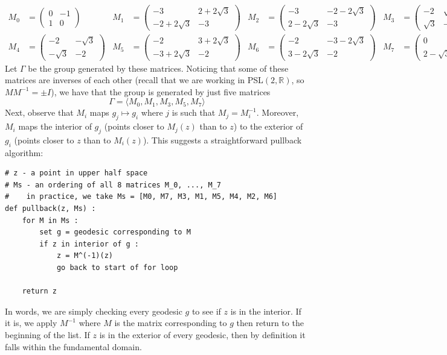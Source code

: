 \documentclass[]{article}
\begin{document}
\begin{align*}
	M_0 &= \begin{pmatrix}
		0 & -1 \\
		1 & 0
	\end{pmatrix} &
	M_1 &= \begin{pmatrix}
		-3 & 2 + 2\sqrt{3} \\
		-2 + 2\sqrt{3} & -3
	\end{pmatrix} &
	M_2 &= \begin{pmatrix}
		-3 & -2 - 2\sqrt{3} \\
		2 - 2\sqrt{3} & -3
	\end{pmatrix} &
	M_3 &= \begin{pmatrix}
		-2 & \sqrt{3} \\
		\sqrt{3} & -2
	\end{pmatrix} \\
	M_4 &= \begin{pmatrix}
		-2 & -\sqrt{3} \\
		-\sqrt{3} & -2
	\end{pmatrix} &
	M_5 &= \begin{pmatrix}
		-2 & 3 + 2\sqrt{3} \\
		-3 + 2\sqrt{3} & -2
	\end{pmatrix} &
	M_6 &= \begin{pmatrix}
		-2 & -3 - 2\sqrt{3} \\
		3 - 2\sqrt{3} & -2
	\end{pmatrix} &
	M_7 &= \begin{pmatrix}
		0 & -2 - \sqrt{3} \\
		2 - \sqrt{3} & 0
	\end{pmatrix}
\end{align*}
Let $\Gamma$ be the group generated by these matrices.
Noticing that some of these matrices are inverses of each other (recall that we are working in PSL$(2, \mathbb{R})$, so $MM^{-1} = \pm I$), we have that the group is generated by just five matrices
$$
\Gamma = \langle M_0, M_1, M_3, M_5, M_7 \rangle
$$
Next, observe that $M_i$ maps $g_j \mapsto g_i$ where $j$ is such that $M_j = M_i^{-1}$.
Moreover, $M_i$ maps the interior of $g_j$ (points closer to $M_j(z)$ than to $z$) to the exterior of $g_i$ (points closer to $z$ than to $M_i(z)$).
This suggests a straightforward pullback algorithm:
\begin{verbatim}
# z - a point in upper half space
# Ms - an ordering of all 8 matrices M_0, ..., M_7
#    in practice, we take Ms = [M0, M7, M3, M1, M5, M4, M2, M6]
def pullback(z, Ms) :
    for M in Ms :
        set g = geodesic corresponding to M
        if z in interior of g :
            z = M^(-1)(z)
            go back to start of for loop
            
    return z
\end{verbatim}
In words, we are simply checking every geodesic $g$ to see if $z$ is in the interior.
If it is, we apply $M^{-1}$ where $M$ is the matrix corresponding to $g$ then return to the beginning of the list.
If $z$ is in the exterior of every geodesic, then by definition it falls within the fundamental domain.
\\
\end{document}
